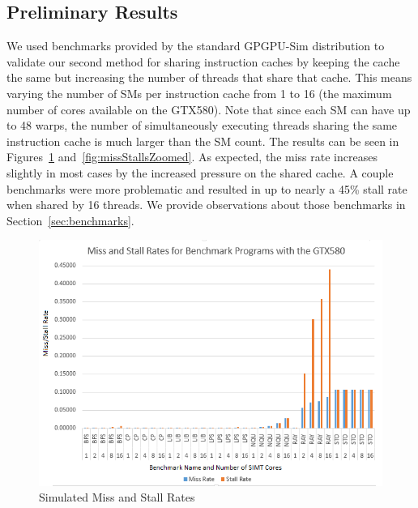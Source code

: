 \subsection{Preliminary Results}

We used benchmarks provided by the standard GPGPU-Sim distribution
to validate our second method for sharing instruction caches by
keeping the cache the same but increasing the number of threads that
share that cache.
This means varying the number of SMs per instruction cache from 1 to
16 (the maximum number of cores available on the GTX580).
Note that since each SM can have up to 48 warps, the number of
simultaneously executing threads sharing the same instruction cache is
much larger than the SM count.
The results can be seen in Figures~\ref{fig:missStalls}
and~\ref{fig:missStallsZoomed}. 
As expected, the miss rate increases slightly in most cases by the
increased pressure on the shared cache.
A couple benchmarks were more problematic and resulted in up to nearly
a 45\% stall rate when shared by 16 threads.
We provide observations about those benchmarks in
Section~\ref{sec:benchmarks}.

\begin{figure}
\centering
\includegraphics[width=\columnwidth]{graphics/miss_stalls_benchmarks.png}
\caption{Simulated Miss and Stall Rates }
\label{fig:missStalls}
\end{figure}


